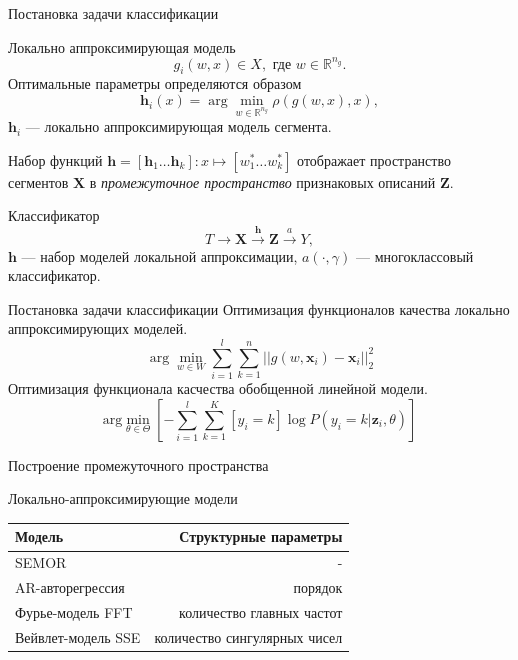 \documentclass{beamer}
\newcommand{\bz}{\mathbf{z}}
\newcommand{\bx}{\mathbf{x}}
\newcommand{\bX}{\mathbf{X}}
\newcommand{\bh}{\mathbf{h}}
\newcommand{\bZ}{\mathbf{Z}}
\newcommand{\brs}[1]{\left(#1\right)}
\newcommand{\sbrs}[1]{\left[#1\right]}
\newcommand{\R}{\mathbb{R}}
\begin{document}
\begin{frame}{Постановка задачи классификации}
    \begin{block}{Локально аппроксимирующая модель}
        $$
        g_i(w, x) \in X, \text{ где }w \in \R^{n_g}.
        $$
        Оптимальные параметры определяются образом
        $$
        \bh_i(x) = \arg\min_{w \in \R^{n_g}} \rho\brs{g(w, x), x},
        $$
        $\bh_i$ — локально аппроксимирующая модель сегмента.
    \end{block}

    Набор функций $\bh = [\bh_1\ldots \bh_k]: x \mapsto [w_1^* \ldots w_k^*]$
    отображает пространство сегментов $\bX$ в
    \textit{промежуточное пространство} признаковых описаний $\bZ$.
    \begin{block}{Классификатор}
        $$
        T \rightarrow \bX \xrightarrow{\bh} \bZ \xrightarrow{a} Y,
        $$
        $\bh$ — набор моделей локальной аппроксимации, $a(\cdot, \gamma)$ —
        многоклассовый классификатор.
    \end{block}
\end{frame}


\begin{frame}{Постановка задачи классификации}
    Оптимизация функционалов качества локально аппроксимирующих моделей.
    $$
        \arg\min_{w \in W} \sum_{i=1}^l\sum_{k=1}^n ||g(w, \bx_i) - \bx_i||_2^2
        $$
    Оптимизация функционала касчества обобщенной линейной модели.
    $$
        \mathrm{arg}\min_{\theta \in \Theta} \sbrs{-\sum_{i=1}^l\sum_{k=1}^K [y_i = k]\log P(y_i = k| \bz_i, \theta)}
    $$
\end{frame}



\begin{frame}{Построение промежуточного пространства}
    \begin{block}{Локально-аппроксимирующие модели}
    \begin{center}
        \begin{tabular}{|l|r|}
            \hline
            Модель & Структурные параметры \\
            \hline
            SEMOR & - \\
            AR-авторегрессия & порядок \\
            Фурье-модель FFT & количество главных частот \\
            Вейвлет-модель SSE & количество сингулярных чисел\\
            \hline
            \end{tabular}
    \end{center}
    \end{block}
\end{frame}
\end{document}
